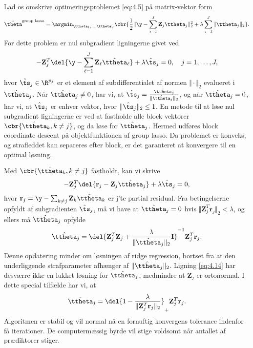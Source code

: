 Lad os omskrive optimeringsproblemet \eqref{eq:4.5} på matrix-vektor form
\begin{align}
\hat{\tbeta}^{\text{group lasso}} = \argmin_{\ttheta_1, \ldots, \ttheta_J} \cbr{\frac{1}{2} \Vert \y - \sum_{j=1}^J \mathbf{Z}_{j} \ttheta_j \Vert_2^2 + \lambda \sum_{j=1}^J \Vert \ttheta_j \Vert_2}. \label{eq:4.11}
\end{align}
For dette problem er nul subgradient ligningerne givet ved
\begin{align*}
- \mathbf{Z}_{j}^T \del{\y - \sum_{\ell=1}^J \mathbf{Z}_\ell \hat{\ttheta}_\ell} + \lambda \hat{\ts}_j = 0, \quad j=1,\ldots, J,
\end{align*} 
hvor $\hat{\ts}_j \in \R^{p_j}$ er et element af subdifferentialet af normen $\Vert \cdot \Vert_2$ evalueret i $\hat{\ttheta}_j$.
Når $\hat{\ttheta}_j \neq 0$, har vi, at $\hat{\ts}_j = \frac{\hat{\ttheta}_j}{\Vert \hat{\ttheta}_j \Vert_2}$, og når $\hat{\ttheta}_j=0$, har vi, at $\hat{\ts}_j$ er enhver vektor, hvor $\Vert \hat{\ts}_j \Vert_2 \leq 1$.
En metode til at løse nul subgradient ligningerne er ved at fastholde alle block vektorer $\cbr{\hat{\ttheta}_k, k \neq j}$, og da løse for $\hat{\ttheta}_j$.
Hermed udføres block coordinate descent på objektfunktionen af group lasso.
Da problemet er konveks, og strafleddet kan separeres efter block, er det garanteret at konvergere til en optimal løsning.

Med $\cbr{\hat{\ttheta}_k, k \neq j}$ fastholdt, kan vi skrive
\begin{align*}
- \mathbf{Z}_{j}^T \del{\mathbf{r}_j - \mathbf{Z}_j \hat{\ttheta}_j} + \lambda \hat{\ts}_j = 0,
\end{align*}
hvor $\mathbf{r}_j = \y - \sum_{k \neq j} \mathbf{Z}_k \hat{\ttheta}_k $ er j'te partial residual.
Fra betingelserne opfyldt af subgradienten $\hat{\ts}_j$, må vi have at $\hat{\ttheta}_j =0$ hvis $\Vert \mathbf{Z}_j^T \mathbf{r}_j \Vert_2 < \lambda$, og ellers må $\hat{\ttheta}_j$ opfylde
\begin{align}
\hat{\ttheta}_j = \del{\mathbf{Z}_j^T \mathbf{Z}_j + \frac{\lambda}{\Vert \hat{\ttheta}_j \Vert_2} \mathbf{I}}^{-1} \mathbf{Z}_j^T \mathbf{r}_j. \label{eq:4.14}
\end{align}
Denne opdatering minder om løsningen af ridge regression, bortset fra at den underliggende strafparameter afhænger af $\Vert \hat{\ttheta}_j \Vert_2$.
Ligning \eqref{eq:4.14} har desværre ikke en lukket løsning for $\hat{\ttheta}_j$, medmindre at $\mathbf{Z}_j$ er ortonormal. 
I dette special tilfælde har vi, at
\begin{align*}
\hat{\ttheta}_j = \del{1 - \frac{\lambda}{\Vert \mathbf{Z}_j^T \mathbf{r}_j \Vert_2}}_+  \mathbf{Z}_j^T \mathbf{r}_j.
\end{align*}
Algoritmen er stabil og vil normal nå en fornuftig konvergens tolerance indenfor få iterationer.
De computermæssig byrde vil stige voldsomt når antallet af prædiktorer stiger.



